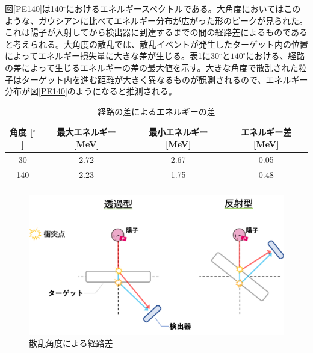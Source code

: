 \documentclass[a4paper,11pt,dvipdfmx]{jsarticle}
\begin{document}
\begin{itemize}
図\ref{PE140}は140$^{\circ}$におけるエネルギースペクトルである。大角度においてはこのような、ガウシアンに比べてエネルギー分布が広がった形のピークが見られた。これは陽子が入射してから検出器に到達するまでの間の経路差によるものであると考えられる。大角度の散乱では、散乱イベントが発生したターゲット内の位置によってエネルギー損失量に大きな差が生じる。表\ref{Edepo}に30$^{\circ}と140^{\circ}$における、経路の差によって生じるエネルギーの差の最大値を示す。大きな角度で散乱された粒子はターゲット内を進む距離が大きく異なるものが観測されるので、エネルギー分布が図\ref{PE140}のようになると推測される。\\

\begin{table}[h]
\centering
\caption{経路の差によるエネルギーの差}
\begin{tabular}{cccc} \hline
  角度 [$^\circ$] & 最大エネルギー [MeV] & 最小エネルギー [MeV] & エネルギー差 [MeV] \\ \hline
  30 & 2.72 & 2.67 & 0.05 \\ 
  140 &  2.23 & 1.75 & 0.48 \\ \hline
  \label{Edepo}
  \end{tabular}
  \centering
\end{table}


\vspace*{8mm}

\begin{figure}[H]
\centering
\includegraphics[width=140mm]{picture/cali/d.png}
\caption{散乱角度による経路差 \protect \footnotemark}
\label{dis}
\end{figure}


\end{itemize}
\end{document}
